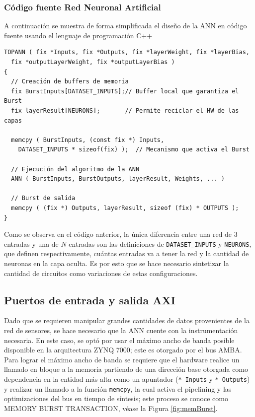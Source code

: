 \subsubsection{Código fuente Red Neuronal Artificial}

A continuación se muestra de forma simplificada el diseño de la ANN en código fuente usando el lenguaje de programación C++

\begin{verbatim}
TOPANN ( fix *Inputs, fix *Outputs, fix *layerWeight, fix *layerBias,
  fix *outputLayerWeight, fix *outputLayerBias )
{  
  // Creación de buffers de memoria
  fix BurstInputs[DATASET_INPUTS];// Buffer local que garantiza el Burst
  fix layerResult[NEURONS];       // Permite reciclar el HW de las capas

  memcpy ( BurstInputs, (const fix *) Inputs,
    DATASET_INPUTS * sizeof(fix) );  // Mecanismo que activa el Burst
  
  // Ejecución del algoritmo de la ANN
  ANN ( BurstInputs, BurstOutputs, layerResult, Weights, ... )
  
  // Burst de salida
  memcpy ( (fix *) Outputs, layerResult, sizeof (fix) * OUTPUTS );
}
\end{verbatim}

Como se observa en el código anterior, la única diferencia entre una red de $3$ entradas y una de $N$ entradas son las definiciones de \texttt{DATASET\_INPUTS} y \texttt{NEURONS}, que definen respectivamente, cuántas entradas va a tener la red y la cantidad de neuronas en la capa oculta. Es por esto que se hace necesario sintetizar la cantidad de circuitos como variaciones de estas configuraciones.



\subsection{Puertos de entrada y salida AXI}

Dado que se requieren manipular grandes cantidades de datos provenientes de la red de sensores, se hace necesario que la ANN cuente con la instrumentación necesaria. En este caso, se optó por usar el máximo ancho de banda posible disponible en la arquitectura ZYNQ 7000; este es otorgado por el bus AMBA. Para lograr el máximo ancho de banda se requiere que el hardware realice un llamado en bloque a la memoria partiendo de una dirección base otorgada como dependencia en la entidad más alta como un apuntador (\texttt{* Inputs} y \texttt{* Outputs}) y realizar un llamado a la función \texttt{memcpy}, la cual activa el pipelining y las optimizaciones del bus en tiempo de síntesis; este proceso se conoce como MEMORY BURST TRANSACTION, véase la Figura \ref{fig:memBurst}.

